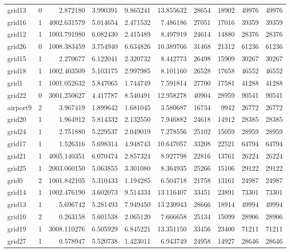 \begin{longtable}{|l|r|r|r|r|r|r|r|r|r|}
grid13 & 0 & 2.872180 & 3.990391 & 9.865241 & 13.855632 & 28654 & 18902 & 49976 & 49976 \\
grid16 & 1 & 4002.631579 & 5.014654 & 2.471532 & 7.486186 & 27051 & 17016 & 39359 & 39359 \\
grid12 & 1 & 1003.791980 & 6.082430 & 2.415489 & 8.497919 & 24614 & 14880 & 28376 & 28376 \\
grid26 & 0 & 1008.383459 & 3.754940 & 6.634826 & 10.389766 & 31468 & 21312 & 61236 & 61236 \\
grid15 & 1 & 2.270677 & 6.122041 & 2.320732 & 8.442773 & 26498 & 15909 & 30267 & 30267 \\
grid18 & 1 & 1002.403509 & 5.103175 & 2.997985 & 8.101160 & 26528 & 17658 & 46552 & 46552 \\
grid1 & 1 & 1001.052632 & 5.847065 & 1.744749 & 7.591814 & 27700 & 17581 & 41288 & 41288 \\
grid22 & 0 & 3001.250627 & 4.417787 & 8.540491 & 12.958278 & 40904 & 28959 & 90541 & 90541 \\
airport9 & 2 & 3.967419 & 1.899642 & 1.681045 & 3.580687 & 16734 & 9942 & 26772 & 26772 \\
grid20 & 1 & 1.964912 & 5.814332 & 2.132550 & 7.946882 & 24618 & 14912 & 28385 & 28385 \\
grid24 & 1 & 2.751880 & 5.229537 & 2.049019 & 7.278556 & 25102 & 15059 & 28959 & 28959 \\
grid17 & 1 & 1.526316 & 5.698314 & 4.948743 & 10.647057 & 33208 & 22521 & 64794 & 64794 \\
grid21 & 1 & 4005.140351 & 6.070474 & 2.857324 & 8.927798 & 22816 & 13761 & 26224 & 26224 \\
grid25 & 1 & 2003.060150 & 5.063855 & 3.301080 & 8.364935 & 25266 & 15106 & 29122 & 29122 \\
grid0 & 2 & 1001.842105 & 5.310433 & 1.194285 & 6.504718 & 21758 & 13161 & 24987 & 24987 \\
grid14 & 1 & 1002.476190 & 3.602073 & 9.514334 & 13.116407 & 33451 & 23891 & 73301 & 73301 \\
grid13 & 1 & 5.696742 & 5.281493 & 7.949450 & 13.230943 & 28666 & 18914 & 49994 & 49994 \\
grid10 & 2 & 0.263158 & 5.601538 & 2.065120 & 7.666658 & 25134 & 15099 & 28906 & 28906 \\
grid19 & 1 & 3008.110276 & 6.505929 & 6.845221 & 13.351150 & 33456 & 23400 & 71211 & 71211 \\
grid27 & 1 & 0.578947 & 5.520738 & 1.423011 & 6.943749 & 24958 & 14927 & 28646 & 28646 \\

\end{longtable}
